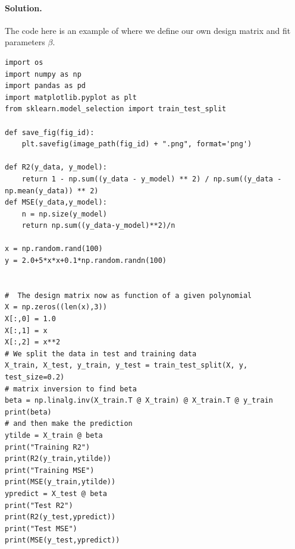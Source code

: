 \documentclass{beamer}
\newenvironment{doconceexercise}{}{}
\newcounter{doconce:movie:counter}
\begin{document}
\begin{frame}
\begin{doconceexercise}
\paragraph{Solution.}
The code here is an example of where we define our own design matrix and fit parameters $\beta$.









































\begin{verbatim}
import os
import numpy as np
import pandas as pd
import matplotlib.pyplot as plt
from sklearn.model_selection import train_test_split

def save_fig(fig_id):
    plt.savefig(image_path(fig_id) + ".png", format='png')

def R2(y_data, y_model):
    return 1 - np.sum((y_data - y_model) ** 2) / np.sum((y_data - np.mean(y_data)) ** 2)
def MSE(y_data,y_model):
    n = np.size(y_model)
    return np.sum((y_data-y_model)**2)/n

x = np.random.rand(100)
y = 2.0+5*x*x+0.1*np.random.randn(100)


#  The design matrix now as function of a given polynomial
X = np.zeros((len(x),3))
X[:,0] = 1.0
X[:,1] = x
X[:,2] = x**2
# We split the data in test and training data
X_train, X_test, y_train, y_test = train_test_split(X, y, test_size=0.2)
# matrix inversion to find beta
beta = np.linalg.inv(X_train.T @ X_train) @ X_train.T @ y_train
print(beta)
# and then make the prediction
ytilde = X_train @ beta
print("Training R2")
print(R2(y_train,ytilde))
print("Training MSE")
print(MSE(y_train,ytilde))
ypredict = X_test @ beta
print("Test R2")
print(R2(y_test,ypredict))
print("Test MSE")
print(MSE(y_test,ypredict))


\end{verbatim}
\end{doconceexercise}
\end{frame}
\end{document}
